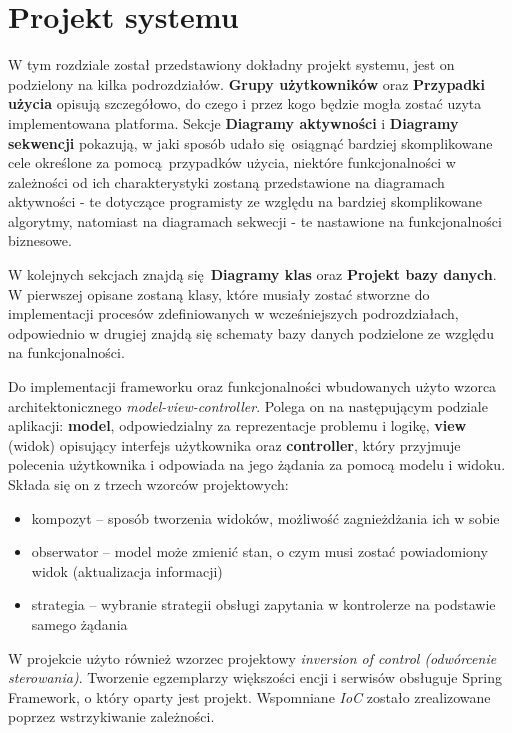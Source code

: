 
\chapter{Projekt systemu}
\thispagestyle{chapterBeginStyle}

W tym rozdziale został przedstawiony dokładny projekt systemu, jest on podzielony na kilka podrozdziałów. \textbf{Grupy użytkowników} oraz \textbf{Przypadki użycia} opisują szczegółowo, do czego i przez kogo będzie mogła zostać uzyta implementowana platforma. Sekcje \textbf{Diagramy aktywności} i \textbf{Diagramy sekwencji} pokazują, w jaki sposób udało się osiągnąć bardziej skomplikowane cele określone za pomocą przypadków użycia, niektóre funkcjonalności w zależności od ich charakterystyki zostaną przedstawione na diagramach aktywności - te dotyczące programisty ze względu na bardziej skomplikowane algorytmy, natomiast na diagramach sekwecji - te nastawione na funkcjonalności biznesowe.

W kolejnych sekcjach znajdą się \textbf{Diagramy klas} oraz \textbf{Projekt bazy danych}. W pierwszej opisane zostaną klasy, które musiały zostać stworzne do implementacji procesów zdefiniowanych w wcześniejszych podrozdziałach, odpowiednio w drugiej znajdą się schematy bazy danych podzielone ze względu na funkcjonalności.

Do implementacji frameworku oraz funkcjonalności wbudowanych użyto wzorca architektonicznego \textit{model-view-controller}. Polega on na następującym podziale aplikacji: \textbf{model}, odpowiedzialny za reprezentacje problemu i logikę, \textbf{view} (widok) opisujący interfejs użytkownika oraz \textbf{controller}, który przyjmuje polecenia użytkownika i odpowiada na jego żądania za pomocą modelu i widoku. Składa się on z trzech wzorców projektowych:
\begin{itemize}
	\item kompozyt -- sposób tworzenia widoków, możliwość zagnieżdżania ich w sobie
	\item obserwator -- model może zmienić stan, o czym musi zostać powiadomiony widok (aktualizacja informacji)
	\item strategia -- wybranie strategii obsługi zapytania w kontrolerze na podstawie samego żądania
\end{itemize}
W projekcie użyto również wzorzec projektowy \textit{inversion of control (odwórcenie sterowania)}. Tworzenie egzemplarzy większości encji i serwisów obsługuje Spring Framework, o który oparty jest projekt. Wspomniane \textit{IoC} zostało zrealizowane poprzez wstrzykiwanie zależności. 

